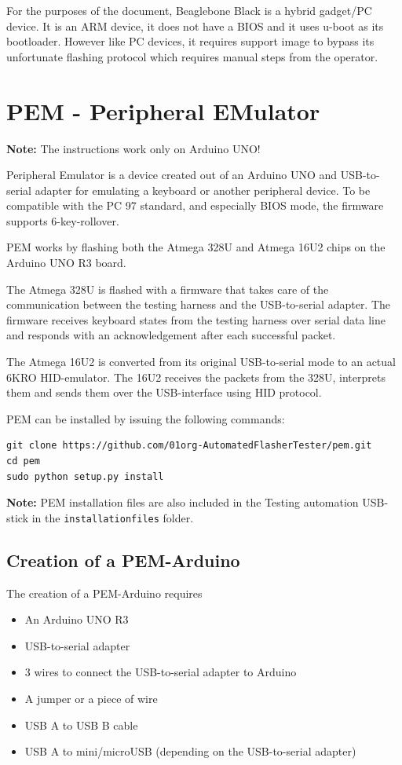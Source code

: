 \documentclass[a4paper,11pt]{article}
\newcommand{\note}{\textbf{Note: }}
\newcommand{\cmd}[1]{\texttt{#1}}
\begin{document}
For the purposes of the document, Beaglebone Black is a hybrid gadget/PC device. It is an ARM device, it does not have a BIOS and it uses u-boot as its bootloader. However like PC devices, it requires support image to bypass its unfortunate flashing protocol which requires manual steps from the operator. 

\section{PEM - Peripheral EMulator}
\label{pem}

\note{The instructions work only on Arduino UNO!}

Peripheral Emulator is a device created out of an Arduino UNO and USB-to-serial adapter for emulating a keyboard or another peripheral device. To be compatible with the PC 97 standard, and especially BIOS mode, the firmware supports 6-key-rollover.

PEM works by flashing both the Atmega 328U and Atmega 16U2 chips on the Arduino UNO R3 board. 

The Atmega 328U is flashed with a firmware that takes care of the communication between the testing harness and the USB-to-serial adapter. The firmware receives keyboard states from the testing harness over serial data line and responds with an acknowledgement after each successful packet.

The Atmega 16U2 is converted from its original USB-to-serial mode to an actual 6KRO HID-emulator. The 16U2 receives the packets from the 328U, interprets them and sends them over the USB-interface using HID protocol.

PEM can be installed by issuing the following commands:
\begin{lstlisting}
git clone https://github.com/01org-AutomatedFlasherTester/pem.git
cd pem
sudo python setup.py install
\end{lstlisting}
\note{PEM installation files are also included in the Testing automation USB-stick in the \cmd{installationfiles} folder.}

\subsection{Creation of a PEM-Arduino}
\label{pemarduino}
The creation of a PEM-Arduino requires 
\begin{itemize}
\item An Arduino UNO R3
\item USB-to-serial adapter
\item 3 wires to connect the USB-to-serial adapter to Arduino
\item A jumper or a piece of wire
\item USB A to USB B cable
\item USB A to mini/microUSB (depending on the USB-to-serial adapter)
\end{itemize}
\end{document}
